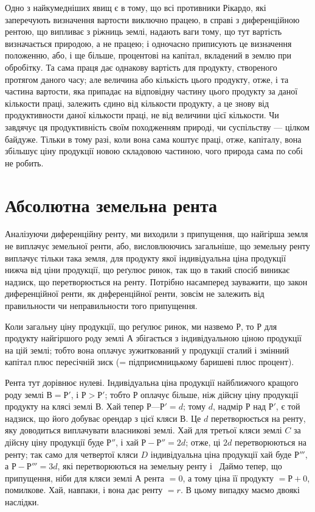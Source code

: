 
Одно з найкумедніших явищ є в тому, що всі противники Рікардо, які
заперечують визначення вартости виключно працею, в справі з диференційною
рентою, що випливає з ріжниць землі, надають ваги тому, що тут вартість
визначається природою, а не працею; і одночасно приписують це визначення
положенню, або, і ще більше, процентові на капітал, вкладений в землю при
обробітку. Та сама праця дає однакову вартість для продукту, створеного
протягом даного часу; але величина або кількість цього продукту, отже, і та
частина вартости, яка припадає на відповідну частину цього продукту за даної
кількости праці, залежить єдино від кількости продукту, а це знову від продуктивности
даної кількости праці, не від величини цієї кількости. Чи завдячує
ця продуктивність своїм походженням природі, чи суспільству — цілком байдуже.
Тільки в тому разі, коли вона сама коштує праці, отже, капіталу, вона
збільшує ціну продукції новою складовою частиною, чого природа сама по собі
не робить.

\section{Абсолютна земельна рента}

Аналізуючи диференційну ренту, ми виходили з припущення, що найгірша
земля не виплачує земельної ренти, або, висловлюючись загальніше, що земельну
ренту виплачує тільки така земля, для продукту якої індивідуальна ціна продукції
нижча від ціни продукції, що реґулює ринок, так що в такий спосіб
виникає надзиск, що перетворюється на ренту. Потрібно насамперед зауважити,
що закон диференційної ренти, як днференційної ренти, зовсім не залежить від
правильности чи неправильности того припущення.

Коли загальну ціну продукції, що реґулює ринок, ми назвемо $Р$, то $Р$ для
продукту найгіршого роду землі $А$ збігається з індивідуальною ціною продукції
на цій землі; тобто вона оплачує зужиткований у продукції сталий і змінний капітал
плюс пересічній зиск (= підприємницькому баришеві плюс процент).

Рента тут дорівнює нулеві. Індивідуальна ціна продукції найближчого
кращого роду землі $В = Р'$, і $Р>Р'$; тобто $Р$ оплачує більше, ніж дійсну
ціну продукції продукту на клясі землі $В$. Хай тепер $Р — Р' = d$; тому
$d$, надмір $Р$ над $Р'$, є той надзиск, що його добуває орендар з цієї кляси $В$.
Це $d$ перетворюється на ренту, яку доводиться виплачувати власникові землі.
Хай для третьої кляси землі $C$ за дійсну ціну продукції буде $Р''$, і хай
$Р - Р'' = 2d$; отже, ці $2d$ перетворюються на ренту; так само для четвертої кляси
$D$ індивідуальна ціна продукції хай буде $Р'''$, а $Р - Р''' = 3d$, які перетворюються
на земельну ренту і~ Даймо тепер, що припущення, ніби для
кляси землі $А$ рента $= 0$, а тому ціна її продукту $= Р + 0$, помилкове. Хай,
навпаки, і вона дає ренту $= r$. В цьому випадку маємо двоякі наслідки.

